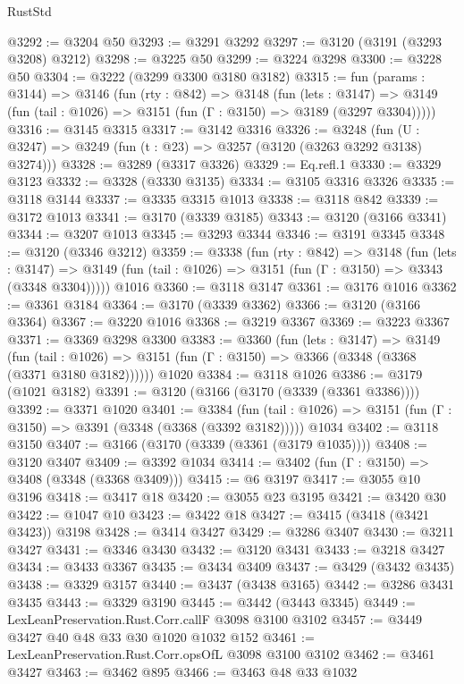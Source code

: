 \begin{lexlean}{RustStd}
\begin{coremodule}
@3292 := @3204 @50
@3293 := @3291 @3292
@3297 := @3120 (@3191 (@3293 @3208) @3212)
@3298 := @3225 @50
@3299 := @3224 @3298
@3300 := @3228 @50
@3304 := @3222 (@3299 @3300 @3180 @3182)
@3315 := fun (params : @3144) =>
  @3146
    (fun (rty : @842) =>
    @3148
      (fun (lets : @3147) =>
      @3149 (fun (tail : @1026) => @3151 (fun (Γ : @3150) => @3189 (@3297 @3304)))))
@3316 := @3145 @3315
@3317 := @3142 @3316
@3326 := @3248 (fun (U : @3247) => @3249 (fun (t : @23) => @3257 (@3120 (@3263 @3292 @3138) @3274)))
@3328 := @3289 (@3317 @3326)
@3329 := Eq.refl.{1}
@3330 := @3329 @3123
@3332 := @3328 (@3330 @3135)
@3334 := @3105 @3316 @3326
@3335 := @3118 @3144
@3337 := @3335 @3315 @1013
@3338 := @3118 @842
@3339 := @3172 @1013
@3341 := @3170 (@3339 @3185)
@3343 := @3120 (@3166 @3341)
@3344 := @3207 @1013
@3345 := @3293 @3344
@3346 := @3191 @3345
@3348 := @3120 (@3346 @3212)
@3359 := @3338
    (fun (rty : @842) =>
    @3148
      (fun (lets : @3147) =>
      @3149 (fun (tail : @1026) => @3151 (fun (Γ : @3150) => @3343 (@3348 @3304)))))
    @1016
@3360 := @3118 @3147
@3361 := @3176 @1016
@3362 := @3361 @3184
@3364 := @3170 (@3339 @3362)
@3366 := @3120 (@3166 @3364)
@3367 := @3220 @1016
@3368 := @3219 @3367
@3369 := @3223 @3367
@3371 := @3369 @3298 @3300
@3383 := @3360
    (fun (lets : @3147) =>
    @3149
      (fun (tail : @1026) => @3151 (fun (Γ : @3150) => @3366 (@3348 (@3368 (@3371 @3180 @3182))))))
    @1020
@3384 := @3118 @1026
@3386 := @3179 (@1021 @3182)
@3391 := @3120 (@3166 (@3170 (@3339 (@3361 @3386))))
@3392 := @3371 @1020
@3401 := @3384
    (fun (tail : @1026) => @3151 (fun (Γ : @3150) => @3391 (@3348 (@3368 (@3392 @3182)))))
    @1034
@3402 := @3118 @3150
@3407 := @3166 (@3170 (@3339 (@3361 (@3179 @1035))))
@3408 := @3120 @3407
@3409 := @3392 @1034
@3414 := @3402 (fun (Γ : @3150) => @3408 (@3348 (@3368 @3409)))
@3415 := @6 @3197
@3417 := @3055 @10 @3196
@3418 := @3417 @18
@3420 := @3055 @23 @3195
@3421 := @3420 @30
@3422 := @1047 @10
@3423 := @3422 @18
@3427 := @3415 (@3418 (@3421 @3423)) @3198
@3428 := @3414 @3427
@3429 := @3286 @3407
@3430 := @3211 @3427
@3431 := @3346 @3430
@3432 := @3120 @3431
@3433 := @3218 @3427
@3434 := @3433 @3367
@3435 := @3434 @3409
@3437 := @3429 (@3432 @3435)
@3438 := @3329 @3157
@3440 := @3437 (@3438 @3165)
@3442 := @3286 @3431 @3435
@3443 := @3329 @3190
@3445 := @3442 (@3443 @3345)
@3449 := LexLeanPreservation.Rust.Corr.callF @3098 @3100 @3102
@3457 := @3449 @3427 @40 @48 @33 @30 @1020 @1032 @152
@3461 := LexLeanPreservation.Rust.Corr.opsOfL @3098 @3100 @3102
@3462 := @3461 @3427
@3463 := @3462 @895
@3466 := @3463 @48 @33 @1032

\end{coremodule}
\end{lexlean}
